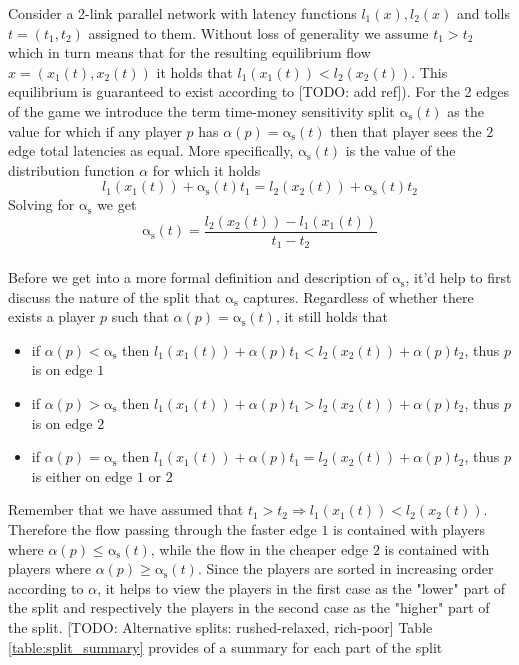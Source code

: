\documentclass[a4paper,11pt]{article}
\newcommand{\as}{\mathrm{\alpha_s}}
\begin{document}
Consider a 2-link parallel network with latency functions $l_1(x), l_2(x)$ and tolls $t=(t_1, t_2)$ assigned to them.
Without loss of generality we assume $t_1 > t_2$ which in turn means that for the resulting equilibrium flow $x = (x_1(t), x_2(t))$ it holds that $l_1(x_1(t)) < l_2(x_2(t))$.
This equilibrium is guaranteed to exist according to [TODO: add ref]).
For the 2 edges of the game we introduce the term time-money sensitivity split $\as(t)$ as the value for which if any player $p$ has $\alpha(p)=\as(t)$ then that player sees the $2$ edge total latencies as equal.
More specifically, $\as(t)$ is the value of the distribution function $\alpha$ for which it holds
\[l_1(x_1(t)) + \as(t) t_1 = l_2(x_2(t)) + \as(t) t_2\]
Solving for $\as$ we get
\[\as(t) = \frac{l_2(x_2(t)) - l_1(x_1(t))}{t_1 - t_2}\]
\\
Before we get into a more formal definition and description of $\as$, it'd help to first discuss the nature of the split that $\as$ captures.
Regardless of whether there exists a player $p$ such that $\alpha(p) = \as(t)$, it still holds that
\begin{itemize}
	\item if $\alpha(p) < \as$ then $l_1(x_1(t)) + \alpha(p) t_1 < l_2(x_2(t)) + \alpha(p) t_2$, thus $p$ is on edge $1$
	\item if $\alpha(p) > \as$ then $l_1(x_1(t)) + \alpha(p) t_1 > l_2(x_2(t)) + \alpha(p) t_2$, thus $p$ is on edge $2$
	\item if $\alpha(p) = \as$ then $l_1(x_1(t)) + \alpha(p) t_1 = l_2(x_2(t)) + \alpha(p) t_2$, thus $p$ is either on edge $1$ or $2$
\end{itemize}
Remember that we have assumed that $t_1 > t_2 \Rightarrow l_1(x_1(t)) < l_2(x_2(t))$.
Therefore the flow passing through the faster edge $1$ is contained with players where $\alpha(p) \le \as(t)$, while the flow in the cheaper edge $2$ is contained with players where $\alpha(p) \ge \as(t)$.
Since the players are sorted in increasing order according to $\alpha$, it helps to view the players in the first case as the "lower" part of the split and respectively the players in the second case as the "higher" part of the split.
[TODO: Alternative splits: rushed-relaxed, rich-poor]
Table \ref{table:split_summary} provides of a summary for each part of the split
\end{document}
